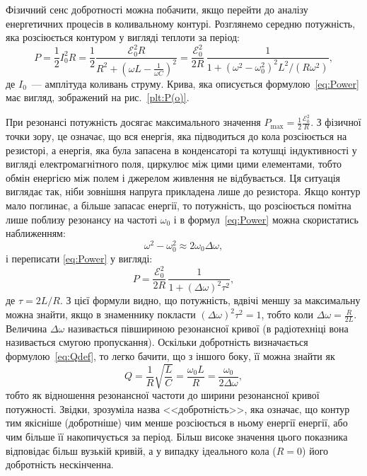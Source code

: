 Фізичний сенс добротності можна побачити, якщо перейти до аналізу енергетичних процесів в коливальному контурі. Розглянемо середню потужність, яка розсіюється контуром у вигляді теплоти за період:
\begin{equation}\label{eq:Power}
    P = \frac12 I_0^2R = \frac12 \frac{\mathcal{E}_0^2R}{R^2 + \left(\omega L - \frac{1}{\omega C}\right)^2} = \frac{\mathcal{E}_0^2}{2R}\, \frac{1}{1  + \left(\omega^2 - \omega_0^2\right)^2 L^2/(R\omega^2)},
\end{equation}
де $I_0$~--- амплітуда коливань струму. Крива, яка описується формулою~\eqref{eq:Power}
 має вигляд, зображений на рис.~\ref{plt:P(o)}.

\begin{center}%
		
		\label{plt:P(o)}
\end{center}

При резонансі потужність досягає максимального значення $P_{\max} = \frac12\frac{\mathcal{E}_0^2}{R}$. З фізичної точки зору, це означає, що вся енергія, яка підводиться до кола розсіюється на резисторі, а енергія, яка була запасена в  конденсаторі та котушці індуктивності у вигляді електромагнітного поля, циркулює між цими цими елементами, тобто обмін енергією між полем і джерелом живлення не відбувається.  Ця ситуація виглядає так, ніби зовнішня напруга прикладена лише до резистора. Якщо контур мало поглинає, а більше запасає енергії, то потужність, що розсіюється помітна лише поблизу резонансу на частоті $\omega_0$ і в формул~\eqref{eq:Power} можна скористатись наближенням:
\[
    \omega^2 - \omega_0^2 \approx 2\omega_0\Delta\omega, 
\]
і переписати \eqref{eq:Power} у вигляді:
\begin{equation}\label{eq:Power2}
    P =  \frac{\mathcal{E}_0^2}{2R}\, \frac{1}{1  + (\Delta\omega)^2\tau^2 },
\end{equation}
де $\tau = 2L/R$. З цієї формули видно, що потужність, вдвічі меншу за максимальну можна знайти, якщо  в знаменнику покласти $(\Delta\omega)^2\tau^2 = 1$, тобто коли $\Delta\omega = \frac{R}{2L}$. Величина $\Delta\omega$ називається півшириною резонансної кривої (в радіотехніці вона називається смугою пропускання). Оскільки добротність визначається формулою~\eqref{eq:Qdef}, то легко бачити, що з іншого боку, її можна знайти як
\begin{equation*}
    Q = \frac{1}{R}\sqrt{\frac{L}{C}} = \frac{\omega_0 L}{R} = \frac{\omega_0}{2\Delta\omega},
\end{equation*}
тобто як  відношення резонансної частоти до ширини резонансної кривої потужності. Звідки, зрозуміла назва <<добротність>>, яка означає, що контур тим якісніше (добротніше) чим менше розсіюється в ньому енергії енергії, або чим більше її накопичується за період. Більш високе значення цього показника відповідає більш вузькій кривій, а у випадку ідеального кола ($R = 0$) його добротність нескінченна.

